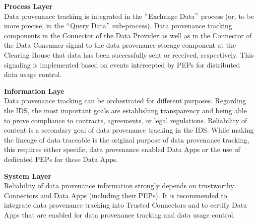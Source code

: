 \textbf{Process Layer}\\
Data provenance tracking is integrated in the $``$Exchange Data$"$  process (or, to be more precise, in the $``$Query Data$"$  sub-process). Data provenance tracking components in the Connector of the Data Provider as well as in the Connector of the Data Consumer signal to the data provenance storage component at the Clearing House that data has been successfully sent or received, respectively. This signaling is implemented based on events intercepted by PEPs for distributed data usage control.

\textbf{Information Laye}\\
Data provenance tracking can be orchestrated for different purposes. Regarding the IDS, the most important goals are establishing transparency and being able to prove compliance to contracts, agreements, or legal regulations. Reliability of content is a secondary goal of data provenance tracking in the IDS. While making the lineage of data traceable is the original purpose of data provenance tracking, this requires either specific, data provenance enabled Data Apps or the use of dedicated PEPs for these Data Apps.


\textbf{System Layer}\\
Reliability of data provenance information strongly depends on trustworthy Connectors and Data Apps (including their PEPs). It is recommended to integrate data provenance tracking into Trusted Connectors and to certify Data Apps that are enabled for data provenance tracking and data usage control.
